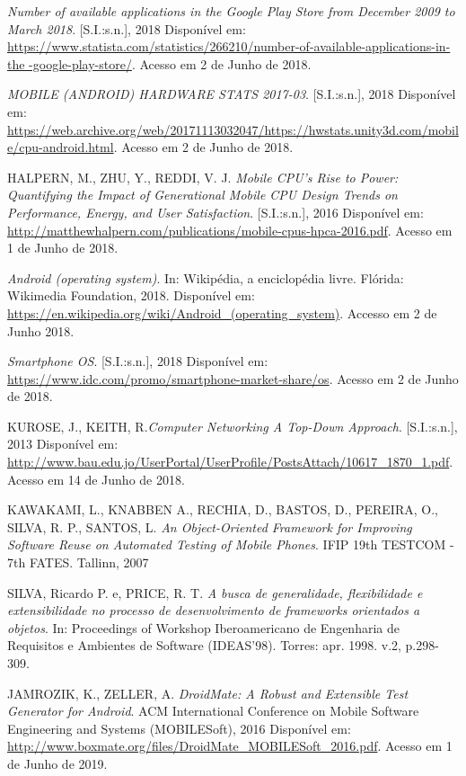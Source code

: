 \documentclass[
    12pt,       %
    openright,      %
    twoside,      %
    a4paper,      %
    english,      %
    french,       %
    spanish,      %
    brazil,       %
    ]{abntex2}
\begin{document}
  \noindent
  \textit{Number of available applications in the Google Play Store from December 2009 to March 2018}.
  [S.I.:s.n.], 2018 Disponível em: \url{https://www.statista.com/statistics/266210/number-of-available-applications-in-the -google-play-store/}. Acesso em 2 de Junho de 2018.

  \noindent
  \textit{MOBILE (ANDROID) HARDWARE STATS 2017-03}. [S.I.:s.n.], 2018 Disponível em: \url{https://web.archive.org/web/20171113032047/https://hwstats.unity3d.com/mobile/cpu-android.html}. Acesso em 2 de Junho de 2018.

  \noindent
  HALPERN, M., ZHU, Y., REDDI, V. J. \textit{Mobile CPU’s Rise to Power: Quantifying the Impact of Generational Mobile CPU Design Trends on Performance, Energy, and User Satisfaction}.
  [S.I.:s.n.], 2016 Disponível em: \url{http://matthewhalpern.com/publications/mobile-cpus-hpca-2016.pdf}. Acesso em 1 de Junho de 2018.

  \noindent
  \textit{Android (operating system)}. In: Wikipédia, a enciclopédia livre. Flórida: Wikimedia Foundation,
  2018. Disponível em:
  \url{https://en.wikipedia.org/wiki/Android_(operating_system)}. Accesso
  em 2 de Junho 2018.

  \noindent
  \textit{Smartphone OS}. [S.I.:s.n.], 2018 Disponível em: \url{https://www.idc.com/promo/smartphone-market-share/os}.
  Acesso em 2 de Junho de 2018.

  \noindent
  KUROSE, J., KEITH, R.\textit{Computer Networking A Top-Down Approach}. [S.I.:s.n.], 2013 Disponível em: \url{http://www.bau.edu.jo/UserPortal/UserProfile/PostsAttach/10617_1870_1.pdf}. Acesso em 14 de Junho de 2018.

  \noindent
  KAWAKAMI, L., KNABBEN A., RECHIA, D., BASTOS, D., PEREIRA, O., SILVA, R. P., SANTOS, L. \textit{An Object-Oriented Framework for Improving Software Reuse on Automated Testing of Mobile Phones}. IFIP 19th TESTCOM - 7th FATES. Tallinn, 2007

  \noindent
  SILVA, Ricardo P. e, PRICE, R. T. \textit{A busca de generalidade, flexibilidade e extensibilidade no processo de desenvolvimento de frameworks orientados a objetos}.
  In: Proceedings of Workshop Iberoamericano de Engenharia de Requisitos e Ambientes de Software (IDEAS'98). Torres: apr. 1998. v.2, p.298-309.

  \noindent
  JAMROZIK, K., ZELLER, A.  \textit{DroidMate: A Robust and Extensible Test Generator
  for Android}. ACM International Conference on Mobile Software Engineering and Systems (MOBILESoft), 2016 Disponível em: \url{http://www.boxmate.org/files/DroidMate_MOBILESoft_2016.pdf}. Acesso em 1 de Junho de 2019.
\end{document}

